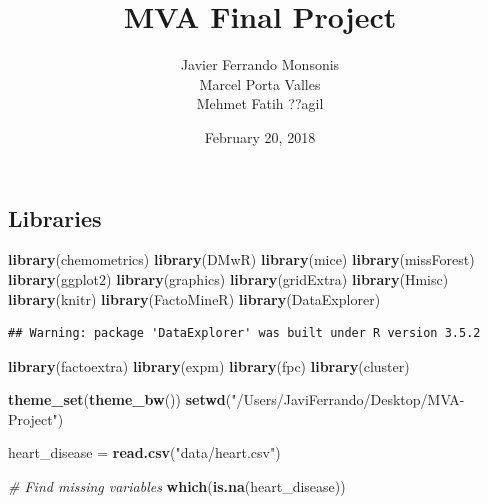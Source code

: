 \documentclass[]{article}
\title{MVA Final Project}
\author{Javier Ferrando Monsonis \\ Marcel Porta Valles \\ Mehmet Fatih ??agil}
\date{February 20, 2018}
\newenvironment{Shaded}{\begin{snugshade}}{\end{snugshade}}
\newcommand{\KeywordTok}[1]{\textcolor[rgb]{0.13,0.29,0.53}{\textbf{#1}}}
\newcommand{\StringTok}[1]{\textcolor[rgb]{0.31,0.60,0.02}{#1}}
\newcommand{\CommentTok}[1]{\textcolor[rgb]{0.56,0.35,0.01}{\textit{#1}}}
\newcommand{\NormalTok}[1]{#1}
\begin{document}
\maketitle

\subsection{Libraries}\label{libraries}

\begin{Shaded}
\begin{Highlighting}[]
\KeywordTok{library}\NormalTok{(chemometrics)}
\KeywordTok{library}\NormalTok{(DMwR)}
\KeywordTok{library}\NormalTok{(mice)}
\KeywordTok{library}\NormalTok{(missForest)}
\KeywordTok{library}\NormalTok{(ggplot2)}
\KeywordTok{library}\NormalTok{(graphics)}
\KeywordTok{library}\NormalTok{(gridExtra)}
\KeywordTok{library}\NormalTok{(Hmisc)}
\KeywordTok{library}\NormalTok{(knitr)}
\KeywordTok{library}\NormalTok{(FactoMineR)}
\KeywordTok{library}\NormalTok{(DataExplorer)}
\end{Highlighting}
\end{Shaded}

\begin{verbatim}
## Warning: package 'DataExplorer' was built under R version 3.5.2
\end{verbatim}

\begin{Shaded}
\begin{Highlighting}[]
\KeywordTok{library}\NormalTok{(factoextra)}
\KeywordTok{library}\NormalTok{(expm)}
\KeywordTok{library}\NormalTok{(fpc)}
\KeywordTok{library}\NormalTok{(cluster)}

\KeywordTok{theme_set}\NormalTok{(}\KeywordTok{theme_bw}\NormalTok{())}
\KeywordTok{setwd}\NormalTok{(}\StringTok{"/Users/JaviFerrando/Desktop/MVA-Project"}\NormalTok{)}
\end{Highlighting}
\end{Shaded}

\begin{Shaded}
\begin{Highlighting}[]
\NormalTok{heart_disease =}\StringTok{ }\KeywordTok{read.csv}\NormalTok{(}\StringTok{"data/heart.csv"}\NormalTok{)}

\CommentTok{# Find missing variables}
\KeywordTok{which}\NormalTok{(}\KeywordTok{is.na}\NormalTok{(heart_disease))}
\end{Highlighting}
\end{Shaded}
\end{document}
